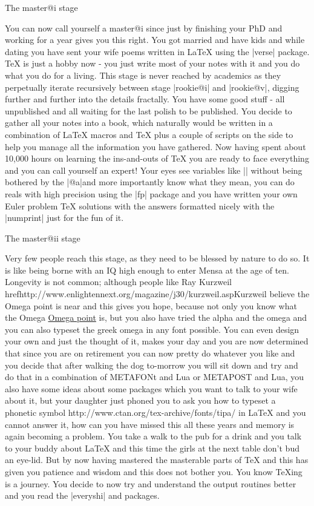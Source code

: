 The master@i stage

You can now call yourself a master@i since just by finishing your PhD and working for a year gives you this right. You got married and have kids and while dating you have sent your wife poems written in LaTeX using the |verse| package. TeX is just a hobby now - you just write most of your notes with it and you do what you do for a living. This stage is never reached by academics as they perpetually iterate recursively between stage |rookie@i| and |rookie@v|, digging further and further into the details fractally. You have some good stuff - all unpublished and all waiting for the last polish to be published. You decide to gather all your notes into a book, which naturally would be written in a combination of LaTeX macros and TeX plus a couple of scripts on the side to help you manage all the information you have gathered. Now having spent about 10,000 hours on learning the ins-and-outs of TeX you are ready to face everything and you can call yourself an expert! Your eyes see variables like |\@carcube| without being bothered by the |@a|and more importantly know what they mean, you can do reals with high precision using the |fp| package and you have written your own Euler problem TeX solutions with the answers formatted nicely with the |numprint| just for the fun of it.

The master@ii stage

Very few people reach this stage, as they need to be blessed by nature to do so. It is like being borne with an IQ high enough to enter Mensa at the age of ten. Longevity is not common; although people like Ray Kurzweil
href{http://www.enlightennext.org/magazine/j30/kurzweil.asp}{Kurzweil} believe the Omega point is near and this gives you hope, because not only you know what the Omega \href{http://en.wikipedia.org/wiki/Omega_Point}{Omega point}  is, but you also have tried the alpha and the omega and you can also typeset the greek omega in any font possible. You can even design your own and just the thought of it, makes your day and you are now determined that since you are on retirement you can now pretty do whatever you like and you decide that after walking the dog to-morrow you will sit down and try and do that in a combination of METAFONt and Lua or METAPOST and Lua, you also have some ideas about some packages which you want to talk to your wife about it, but your daughter just phoned you to ask you how to typeset a phonetic symbol http://www.ctan.org/tex-archive/fonts/tipa/ in LaTeX and you cannot answer it, how can you have missed this all these years and memory is again becoming a problem. You take a walk to the pub for a drink and you talk to your buddy about LaTeX and this time the girls at the next table don't bud an eye-lid. But by now having mastered the masterable parts of TeX and this has given you patience and wisdom and this does not bother you. You know TeXing is a journey. You decide to now try and understand the output routines better and you read the |everyshi|  and  packages.


